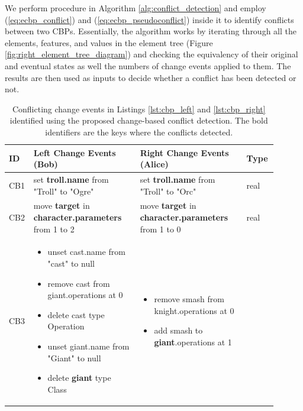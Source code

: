 We perform procedure in Algorithm \ref{alg:conflict_detection} and employ (\ref{eq:ecbp_conflict}) and (\ref{eq:ecbp_pseudoconflict}) inside it to identify conflicts between two CBPs. Essentially, the algorithm works by iterating through all the elements, features, and values in the element tree  (Figure \ref{fig:right_element_tree_diagram}) and checking the equivalency of their original and eventual states as well the numbers of change events applied to them. The results are then used as inputs to decide whether a conflict has been detected or not.

\begin{table}[ht]
\centering
\caption{Conflicting change events in Listings \ref{lst:cbp_left} and \ref{lst:cbp_right} identified using the proposed change-based conflict detection. The bold identifiers are the keys where the conflicts detected.}
\label{table:conflicts_cbp}
\begin{tabular}{|p{0.04\linewidth}|p{0.38\linewidth}|p{0.38\linewidth}|
		p{0.1\linewidth}|}
	\hline
	\textbf{ID} & 
	\textbf{Left Change Events (Bob)} & 
	\textbf{Right Change Events (Alice)} & 
	\textbf{Type}\\ 
	\hline
	CB1 & 
	set \textbf{troll.name} from "Troll" to "Ogre" & 
	set \textbf{troll.name} from "Troll" to "Orc" & 
	real \\
	\hline
	CB2 & move \textbf{target} in \textbf{character.parameters} from 1 to 2 & 
	move \textbf{target} in \textbf{character.parameters} from 1 to 0 & 
	real \\ 
	\hline
	CB3 & 
	\begin{minipage}[t]{\linewidth}
		\raggedright
		\begin{itemize}[leftmargin=0pt]
			\setlength
			\item[] unset cast.name from "cast" to null
			\item[] remove cast from giant.operations at 0
			\item[] delete cast type Operation
			\item[] unset giant.name from "Giant" to null
			\item[] delete \textbf{giant} type Class
		\end{itemize}
	\end{minipage}
	& 
	\begin{minipage}[t]{\linewidth}
		\raggedright
		\begin{itemize}[leftmargin=0pt]
			\setlength
			\item[] remove smash from knight.operations at 0
			\item[] add smash to \textbf{giant}.operations at 1

\end{itemize}
\end{minipage}
\end{tabular}
\end{table}
